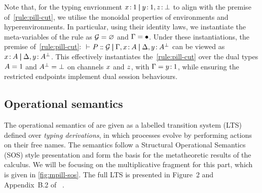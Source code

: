 Note that, for the typing envrionment {$x\colon\mspace{-2mu}1 \mathbin{\boldsymbol{|}} y\colon\mspace{-2mu}1, z\colon\mspace{-2mu}\bot$} to align with the premise of~\cref{rule:pill-cut}, we utilise the monoidal properties of environments and hyperenvironments. In particular, using their identity laws, we instantiate the meta-variables of the rule as {$\mathcal{G} = \varnothing$} and {$\Gamma = \bullet$}. Under these instantiations, the premise of~\cref{rule:pill-cut}: {${{} \vdash_{} P \mathrel{:\mspace{-1mu}:} \mathcal{G} \mathbin{\boldsymbol{|}} \Gamma, x\colon\mspace{-2mu}A \mathbin{\boldsymbol{|}} \Delta, y\colon\mspace{-2mu}A^{\bot}}$} can be viewed as {$x\colon\mspace{-2mu}A \mathbin{\boldsymbol{|}} \Delta, y\colon\mspace{-2mu}A^{\bot}$}. This effectively instantiates the~\ref{rule:pill-cut} over the dual types {$A = 1$} and {$A^{\bot} = \bot$} on channels {$x$} and {$z$}, with {$\Gamma = y\colon\mspace{-2mu}1$}, while ensuring the restricted endpoints implement dual session behaviours.

\subsection{Operational semantics}\label{subsec:operational-semantics}
The operational semantics of \pill{} are given as a labelled transition system (LTS) defined over \emph{typing derivations}, in which processes evolve by performing actions on their free names. The semantics follow a Structural Operational Semantics (SOS) style presentation and form the basis for the metatheoretic results of the calculus. We will be focusing on the multiplicative fragment for this part, which is given in \cref{fig:mpill-sos}. The full LTS is presented in Figure~2 and Appendix~B.2 of~\citet{abs-2106-11818} .

